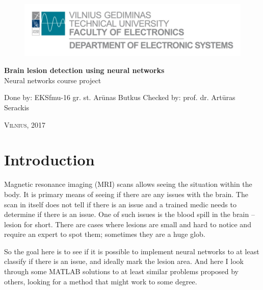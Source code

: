 \documentclass[12pt]{article}
\begin{document}
\begin{titlepage}
	\begin{center}
		\begin{figure}[h]
		\centering
		\includegraphics[scale=1]{img/asd}
		\end{figure}	
	\vspace{2cm}
	\huge{\bfseries Brain lesion detection using neural networks}\\
	\vspace{2cm}
	\large{Neural networks course project}\\
	\vspace{5cm}
	\end{center}
	\begin{flushright}
	\large Done by: EKSfmu-16 gr. st. Arūnas Butkus
	\linebreak
	\large Checked by: prof. dr. Artūras Serackis
	\end{flushright}
	\vspace{6cm}
	\begin{center}
	\textsc{Vilnius, 2017}
	\end{center}
\end{titlepage}


\section{Introduction}
\label{sec:intro}

Magnetic resonance imaging (MRI) scans allows seeing the situation within the body. It is primary means of seeing if there are any issues with the brain. The scan in itself does not tell if there is an issue and a trained medic needs to determine if there is an issue. One of such issues is the blood spill in the brain – lesion for short. There are cases where lesions are small and hard to notice and require an expert to spot them; sometimes they are a huge glob.

So the goal here is to see if it is possible to implement neural networks to at least classify if there is an issue, and ideally mark the lesion area. And here I look through some MATLAB solutions to at least similar problems proposed by others, looking for a method that might work to some degree.
\end{document}
